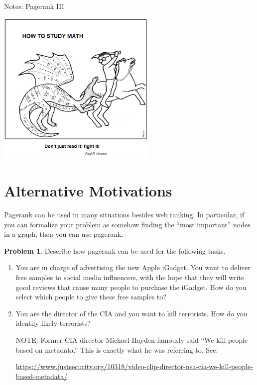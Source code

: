 \documentclass[10pt]{exam}
\theoremstyle{definition}
\newtheorem{problem}{Problem}
\begin{document}
\begin{center}
{
\Huge
Notes: Pagerank III
}

\vspace{0.15in}
\includegraphics[width=3in]{saint_curious_george}
\vspace{-0.15in}

\end{center}

\begin{center}
\end{center}

\section{Alternative Motivations}

Pagerank can be used in many situations besides web ranking.
In particular, if you can formalize your problem as somehow finding the ``most important'' nodes in a graph,
then you can use pagerank.

\begin{problem}
    Describe how pagerank can be used for the following tasks.
    \begin{enumerate}
        \item 
            You are in charge of advertising the new Apple iGadget.
            You want to deliver free samples to social media influencers,
            with the hope that they will write good reviews that cause many people to purchase the iGadget.
            How do you select which people to give these free samples to?
            \newpage
        \item 
            You are the director of the CIA and you want to kill terrorists.
            How do you identify likely terrorists?


            \vspace{8in}
            NOTE:
            Former CIA director Michael Hayden famously said ``We kill people based on metadata.''
            This is exactly what he was referring to.
            See:

            \url{https://www.justsecurity.org/10318/video-clip-director-nsa-cia-we-kill-people-based-metadata/}
    \end{enumerate}
\end{problem}
\end{document}
